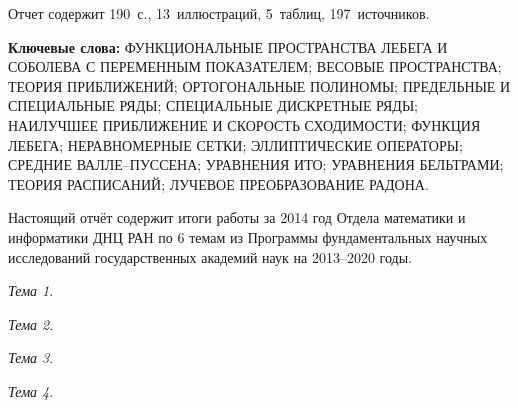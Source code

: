 \Referat %


Отчет содержит 190~с., 13~иллюстраций,  5~таблиц,  197~источников.

 \bigskip
 \textbf{ Ключевые
  слова:}
  ФУНКЦИОНАЛЬНЫЕ ПРОСТРАНСТВА ЛЕБЕГА И СОБОЛЕВА С ПЕРЕМЕННЫМ ПОКАЗАТЕЛЕМ; ВЕСОВЫЕ ПРОСТРАНСТВА; ТЕОРИЯ ПРИБЛИЖЕНИЙ; ОРТОГОНАЛЬНЫЕ ПОЛИНОМЫ; ПРЕДЕЛЬНЫЕ И СПЕЦИАЛЬНЫЕ РЯДЫ; СПЕЦИАЛЬНЫЕ ДИСКРЕТНЫЕ РЯДЫ; НАИЛУЧШЕЕ ПРИБЛИЖЕНИЕ И СКОРОСТЬ СХОДИМОСТИ; ФУНКЦИЯ ЛЕБЕГА; НЕРАВНОМЕРНЫЕ СЕТКИ; ЭЛЛИПТИЧЕСКИЕ ОПЕРАТОРЫ; СРЕДНИЕ ВАЛЛЕ--ПУССЕНА; УРАВНЕНИЯ ИТО; УРАВНЕНИЯ БЕЛЬТРАМИ; ТЕОРИЯ РАСПИСАНИЙ; ЛУЧЕВОЕ ПРЕОБРАЗОВАНИЕ РАДОНА.

 \bigskip



Настоящий отчёт содержит итоги работы за 2014 год Отдела математики и информатики ДНЦ РАН по 6 темам
из Программы фундаментальных научных исследований государственных академий наук на 2013–2020 годы.


\textit{Тема 1}.



\textit{Тема 2}.



\textit{Тема 3}.



\textit{Тема 4}.


